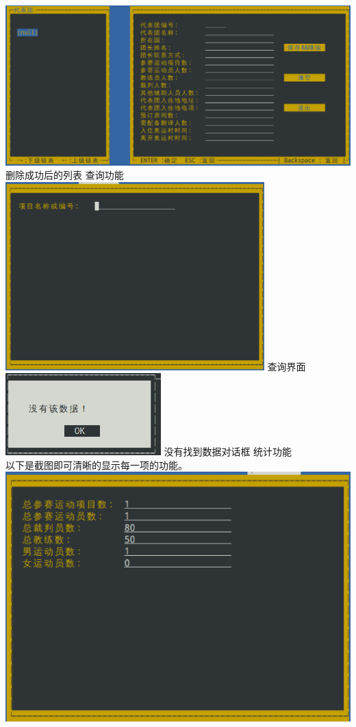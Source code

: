 \documentclass[10pt,a4paper]{article}
\begin{document}
\includegraphics[width=14cm]{deletes1}
\newline
删除成功后的列表
 查询功能 \\
\includegraphics[width=10cm]{query}
\newline
查询界面
\newline
\includegraphics[width=6cm]{queryf}
\newline
没有找到数据对话框
 统计功能 \\
以下是截图即可清晰的显示每一项的功能。
\newline
\includegraphics[width=14cm]{staAll}
\end{document}
